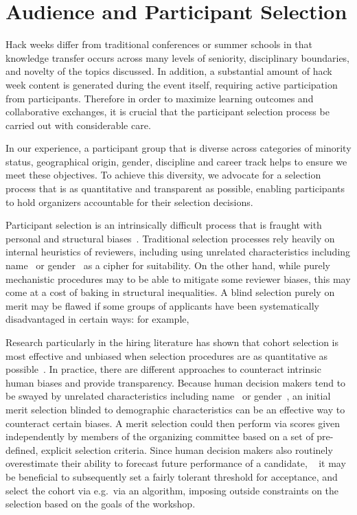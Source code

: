 \section*{Audience and Participant Selection}
Hack weeks differ from traditional conferences or summer schools in that knowledge transfer occurs across many levels of seniority, disciplinary boundaries, and novelty of the topics discussed.
In addition, a substantial amount of hack week content is generated during the event itself, requiring active participation from participants.
Therefore in order to maximize learning outcomes and collaborative exchanges, it is crucial that the participant selection process be carried out with considerable care.

In our experience, a participant group that is diverse across categories of minority status, geographical origin, gender, discipline and career track helps to ensure we meet these objectives.
To achieve this diversity, we advocate for a selection process that is as quantitative and transparent as possible, enabling participants to hold organizers accountable for their selection decisions.

Participant selection is an intrinsically difficult process that is fraught with personal and structural biases~\cite[e.g.][]{sunstein2015wiser}. Traditional selection processes rely heavily on internal heuristics of reviewers, including using unrelated characteristics including name~\cite{bertrand2004} or gender~\cite{mossracusin2012} as a cipher for suitability. On the other hand, while purely mechanistic procedures may to be able to mitigate some reviewer biases, this may come at a cost of baking in structural inequalities. A blind selection purely on merit may be flawed if some groups of applicants have been systematically disadvantaged in certain ways: for example, 

Research particularly in the hiring literature has shown that cohort selection is most effective and unbiased when selection procedures are as quantitative as possible~\cite{sunstein2015wiser}. 
In practice, there are different approaches to counteract intrinsic human biases and provide transparency. 
Because human decision makers tend to be swayed by unrelated characteristics including name~\cite{bertrand2004} or gender~\cite{mossracusin2012}, an initial merit selection blinded to demographic characteristics can be an effective way to counteract certain biases. A merit selection could then perform via scores given independently by members of the organizing committee based on a set of pre-defined, explicit selection criteria. 
Since human decision makers also routinely overestimate their ability to forecast future performance of a candidate, ~\cite{highhouse2008} it may be beneficial to subsequently set a fairly tolerant threshold for acceptance, and select the cohort via e.g.\ via an algorithm, imposing outside constraints on the selection based on the goals of the workshop. 

